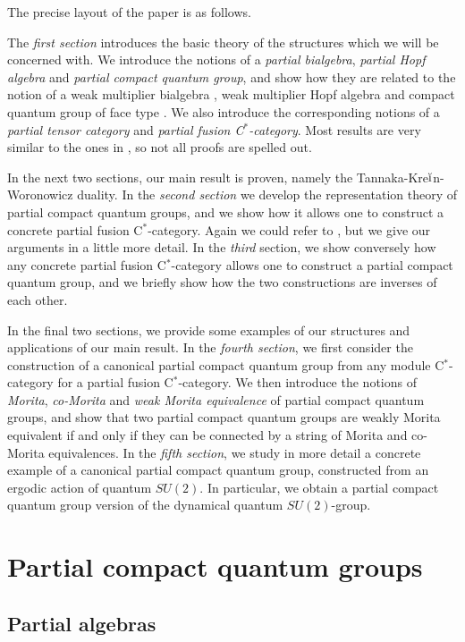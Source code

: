\documentclass[10pt]{article}
\theoremstyle{definition}
\numberwithin{equation}{section}
\begin{document}
The precise layout of the paper is as follows.

The \emph{first section} introduces the basic theory of the structures
which we will be concerned with. We introduce the notions of a
\emph{partial bialgebra}, \emph{partial Hopf algebra} and
\emph{partial compact quantum group}, and show how they are related to
the notion of a weak multiplier bialgebra \cite{Boh1}, weak multiplier
Hopf algebra \cite{VDW1,VDW2} and compact quantum group of face type
\cite{Hay1}. We also introduce the corresponding notions of a \emph{partial tensor category} and \emph{partial fusion C$^*$-category}. Most results are very similar to the ones in \cite{Hay1}, so not all proofs are spelled out.

In the next two sections, our main result is proven, namely the Tannaka-Kre$\breve{\textrm{\i}}$n-Woronowicz duality. In the \emph{second section} we develop the representation theory of partial compact quantum groups, and we show how it allows one to construct a concrete partial fusion C$^*$-category. Again we could refer to \cite{Hay1}, but we give our arguments in a little more detail. In the \emph{third} section, we show conversely how any concrete partial fusion C$^*$-category allows one to construct a partial compact quantum group, and we briefly show how the two constructions are inverses of each other.

In the final two sections, we provide some examples of our structures and applications of our main result. In the \emph{fourth section}, we first consider the construction of a canonical partial compact quantum group from any module C$^*$-category for a partial fusion C$^*$-category. We then introduce the notions of \emph{Morita}, \emph{co-Morita} and \emph{weak Morita equivalence} \cite{Mug1} of partial compact quantum groups, and show that two partial compact quantum groups are weakly Morita equivalent if and only if they can be connected by a string of Morita and co-Morita equivalences. In the \emph{fifth section}, we study in more detail a concrete example of a canonical partial compact quantum group, constructed from an ergodic action of quantum $SU(2)$. In particular, we obtain a partial compact quantum group version of the dynamical quantum $SU(2)$-group. 

\section{Partial compact quantum groups}

\subsection{Partial algebras}
\end{document}
